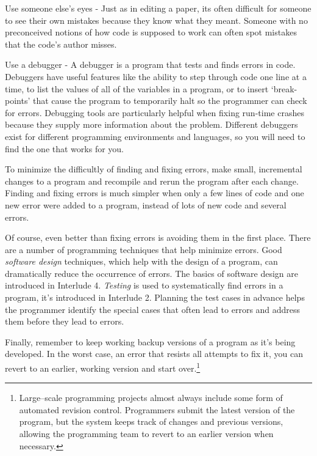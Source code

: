 \begin{tight_itemize}
\item Use someone else's eyes - Just as in editing a paper, its often difficult for someone to see their own mistakes because they know what they meant.  Someone with no preconceived notions of how code is supposed to work can often spot mistakes that the code's author misses.

\item Use a debugger - A debugger is a program that tests and finds errors in code.  Debuggers have useful features like the ability to step through code one line at a time, to list the values of all of the variables in a program, or to insert `break-points' that cause the program to temporarily halt so the programmer can check for errors.  Debugging tools are particularly helpful when fixing run-time crashes because they supply more information about the problem.  Different debuggers exist for different programming environments and languages, so you will need to find the one that works for you.
\end{tight_itemize}

To minimize the difficultly of finding and fixing errors, make small, incremental changes to a program and recompile and rerun the program after each change.  Finding and fixing errors is much simpler when only a few lines of code and one new error were added to a program, instead of lots of new code and several errors.  

Of course, even better than fixing errors is avoiding them in the first place.  There are a number of programming techniques that help minimize errors.  Good \emph{software design} techniques, which help with the design of a program, can dramatically reduce the occurrence of errors.  The basics of software design are introduced in Interlude 4.  \emph{Testing} is used to systematically find errors in a program, it's introduced in Interlude 2.  Planning the test cases in advance helps the programmer identify the special cases that often lead to errors and address them before they lead to errors.   

Finally, remember to keep working backup versions of a program as it's being developed.  In the worst case, an error that resists all attempts to fix it, you can revert to an earlier, working version and start over.\footnote{Large--scale programming projects almost always include some form of automated revision control.  Programmers submit the latest version of the program, but the system keeps track of  changes and previous versions, allowing the programming team to revert to an earlier version when necessary. }